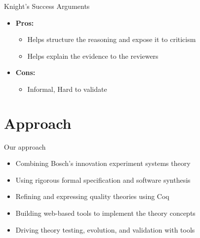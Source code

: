 \documentclass[xcolor=x11names,compress]{beamer}
\renewcommand{\(}{\begin{columns}}
\renewcommand{\)}{\end{columns}}
\newcommand{\<}[1]{\begin{column}{#1}}
\renewcommand{\>}{\end{column}}
\begin{document}
\begin{frame}{Knight's Success Arguments}
\begin{itemize}
\item \textbf{Pros:} \\
	\begin{itemize}
	\item Helps structure the reasoning and expose it to criticism
	\item Helps explain the evidence to the reviewers
    \end{itemize}
\item \textbf{Cons:} \\
    \begin{itemize}
	\item Informal, Hard to validate
    \end{itemize}
\end{itemize}
\end{frame}


\section{Approach}
\begin{frame}{Our approach}
\begin{itemize}
		\item Combining Bosch's innovation experiment systems  theory
		\item Using rigorous formal specification and software synthesis
		\item Refining and expressing quality theories using Coq
		\item Building web-based tools to implement the theory concepts
		\item Driving theory testing, evolution, and validation with tools
\end{itemize}
\end{frame}

\end{document}
